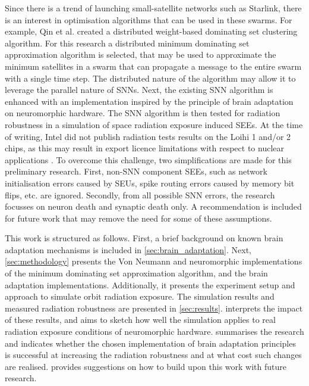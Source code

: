 Since there is a trend of launching small-satellite networks such as Starlink, there is an interest in optimisation algorithms that can be used in these swarms. For example, Qin et al. created a distributed weight-based dominating set clustering algorithm\cite{todo}.%
For this research a distributed minimum dominating set approximation algorithm is selected, that may be used to approximate the minimum satellites in a swarm that can propagate a message to the entire swarm with a single time step. The distributed nature of the algorithm may allow it to leverage the parallel nature of SNNs.
Next, the existing SNN algorithm is enhanced with an implementation inspired by the principle of brain adaptation on neuromorphic hardware. The SNN algorithm is then tested for radiation robustness in a simulation of space radiation exposure induced SEEs. At the time of writing, Intel did not publish radiation tests results on the Loihi 1 and/or 2 chips, as this may result in export licence limitations with respect to nuclear applications \cite{inrc_meeting}. To overcome this challenge, two simplifications are made for this preliminary research. First, non-SNN component SEEs, such as network initialisation errors caused by SEUs, spike routing errors caused by memory bit flips, etc. are ignored. Secondly, from all possible SNN errors, the research focusses on neuron death and synaptic death only. A recommendation is included for future work that may remove the need for some of these assumptions. %

This work is structured as follows. First, a brief background on known brain adaptation mechanisms is included in \cref{sec:brain_adaptation}. Next, \cref{sec:methodology} presents the Von Neumann and neuromorphic implementations of the minimum dominating set approximation algorithm, and the brain adaptation implementations. Additionally, it presents the experiment setup and approach to simulate orbit radiation exposure. The simulation results and measured radiation robustness are presented in \cref{sec:results}.  interprets the impact of these results, and aims to sketch how well the simulation applies to real radiation exposure conditions of neuromorphic hardware.  summarises the research and indicates whether the chosen implementation of brain adaptation principles is successful at increasing the radiation robustness and at what cost such changes are realised.  provides suggestions on how to build upon this work with future research. %
